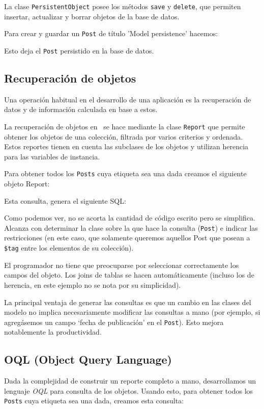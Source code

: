 La clase \verb'PersistentObject' posee los métodos \verb'save' y \verb'delete', que permiten insertar, actualizar y borrar objetos de la base de datos.

Para crear y guardar un \verb'Post' de título 'Model persistence' hacemos:


Esto deja el \verb'Post' persistido en la base de datos.

\subsection{Recuperación de objetos}

Una operación habitual en el desarrollo de una aplicación es la recuperación de datos y de información calculada en base a estos.

La recuperación de objetos en \PWB \ se hace mediante la clase \verb"Report" que permite obtener los objetos de una colección, filtrada por varios criterios y ordenada. Estos reportes tienen en cuenta las subclases de los objetos y utilizan herencia para las variables de instancia.

Para obtener todos los \verb"Posts" cuya etiqueta sea una dada creamos el siguiente objeto Report:


Esta consulta, genera el siguiente SQL:


Como podemos ver, no se acorta la cantidad de código escrito pero se simplifica. Alcanza con determinar la clase sobre la que hace la consulta (\verb"Post") e indicar las restricciones (en este caso, que solamente queremos aquellos Post que posean a \verb'$tag' entre los elementos de su colección). %

El programador no tiene que preocuparse por seleccionar correctamente los campos del objeto. Los joins de tablas se hacen automáticamente (incluso los de herencia, en este ejemplo no se nota por su simplicidad).

La principal ventaja de generar las consultas es que un cambio en las clases del modelo no implica necesariamente modificar las consultas a mano (por ejemplo, si agregásemos un campo `fecha de publicación' en el \verb"Post"). Esto mejora notablemente la productividad.

\subsection{OQL (Object Query Language)}
\label{sub-oql}
Dada la complejidad de construir un reporte completo a mano, desarrollamos un lenguaje \emph{OQL} para consulta de los objetos. Usando esto, para obtener todos los \verb"Posts" cuya etiqueta sea una dada, creamos esta consulta:

